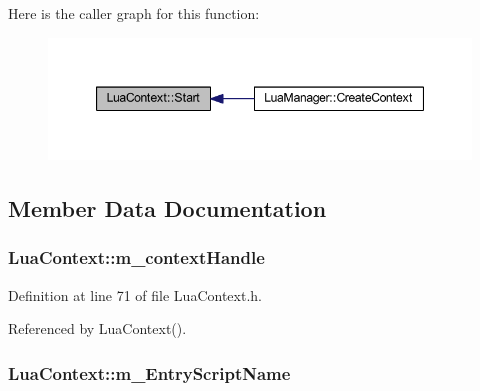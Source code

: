 Here is the caller graph for this function\+:
\nopagebreak
\begin{figure}[H]
\begin{center}
\leavevmode
\includegraphics[width=347pt]{class_lua_context_a9a21dfe0dc89a3611eb13a7470a87acf_icgraph}
\end{center}
\end{figure}




\subsection{Member Data Documentation}
\subsubsection[{\texorpdfstring{m\+\_\+context\+Handle}{m_contextHandle}}]{ Lua\+Context\+::m\+\_\+context\+Handle\hspace{0.3cm}{\ttfamily [private]}}\hypertarget{class_lua_context_a69bdee3a44a0267e554bb50dd9c1e988}{}\label{class_lua_context_a69bdee3a44a0267e554bb50dd9c1e988}


Definition at line 71 of file Lua\+Context.\+h.



Referenced by Lua\+Context().

\subsubsection[{\texorpdfstring{m\+\_\+\+Entry\+Script\+Name}{m_EntryScriptName}}]{ Lua\+Context\+::m\+\_\+\+Entry\+Script\+Name\hspace{0.3cm}{\ttfamily [private]}}\hypertarget{class_lua_context_a3308a35d8225e9af88307ae7c4aec1f4}{}\label{class_lua_context_a3308a35d8225e9af88307ae7c4aec1f4}


